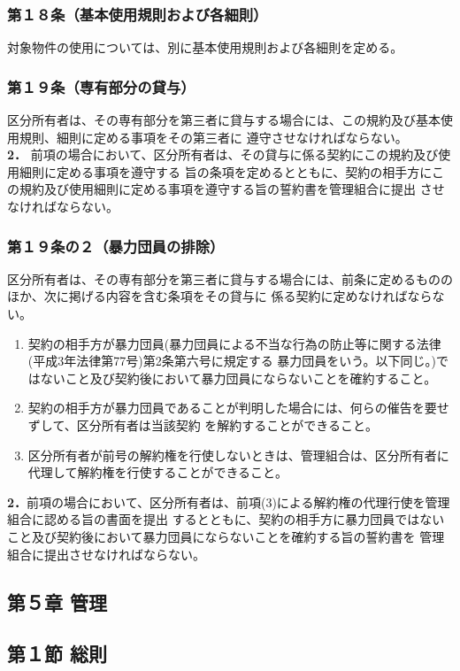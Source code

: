 \documentclass[
  luatex,
  paper=a4paper,
  fontsize=11pt,
  jafontsize=10pt,
  jlreq_notes,
]{jlreq}
\begin{document}
  \subsubsection*{第１８条（基本使用規則および各細則）}
  対象物件の使用については、別に基本使用規則および各細則を定める。
  \subsubsection*{第１９条（専有部分の貸与）}
  区分所有者は、その専有部分を第三者に貸与する場合には、この規約及び基本使用規則、細則に定める事項をその第三者に
  遵守させなければならない。\\
  \textbf{2．} 前項の場合において、区分所有者は、その貸与に係る契約にこの規約及び使用細則に定める事項を遵守する
  旨の条項を定めるとともに、契約の相手方にこの規約及び使用細則に定める事項を遵守する旨の誓約書を管理組合に提出
  させなければならない。
  
  \subsubsection*{第１９条の２（暴力団員の排除）}
  区分所有者は、その専有部分を第三者に貸与する場合には、前条に定めるもののほか、次に掲げる内容を含む条項をその貸与に
  係る契約に定めなければならない。
  \begin{enumerate}
  \item 契約の相手方が暴力団員(暴力団員による不当な行為の防止等に関する法律(平成3年法律第77号)第2条第六号に規定する
  暴力団員をいう。以下同じ。)ではないこと及び契約後において暴力団員にならないことを確約すること。
  \item 契約の相手方が暴力団員であることが判明した場合には、何らの催告を要せずして、区分所有者は当該契約
  を解約することができること。
  \item 区分所有者が前号の解約権を行使しないときは、管理組合は、区分所有者に代理して解約権を行使することができること。
  \end{enumerate}
  \textbf{2．}前項の場合において、区分所有者は、前項(3)による解約権の代理行使を管理組合に認める旨の書面を提出
  するとともに、契約の相手方に暴力団員ではないこと及び契約後において暴力団員にならないことを確約する旨の誓約書を
  管理組合に提出させなければならない。\\
  
  \begin{center}
  \subsection*{第５章 管理}
  \subsection*{第１節 総則}
  \end{center}
\end{document}
